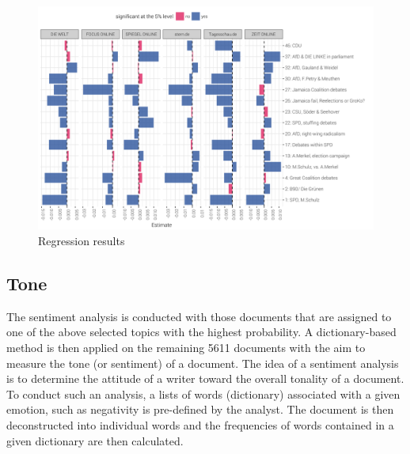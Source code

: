 \documentclass[12pt,a4paper,notitlepage]{article}
\begin{document}
\begin{figure}[H]
	\caption{Regression results}
		\begin{center}
			\includegraphics[width=\textwidth,keepaspectratio]{../figs/estimates.png}
		\end{center}
	\label{fig_estimateEffects}
\end{figure}

\subsection{Tone}\label{subsection_tone}

The sentiment analysis is conducted with those documents that are assigned to one of the above selected topics with the highest probability. A dictionary-based method is then applied on the remaining 5611 documents with the aim to measure the tone (or sentiment) of a document. The idea of a sentiment analysis is to determine the attitude of a writer toward the overall tonality of a document. To conduct such an analysis, a lists of words (dictionary) associated with a given emotion, such as negativity is pre-defined by the analyst. The document is then deconstructed into individual words and the frequencies of words contained in a given dictionary are then calculated. 
\end{document}
